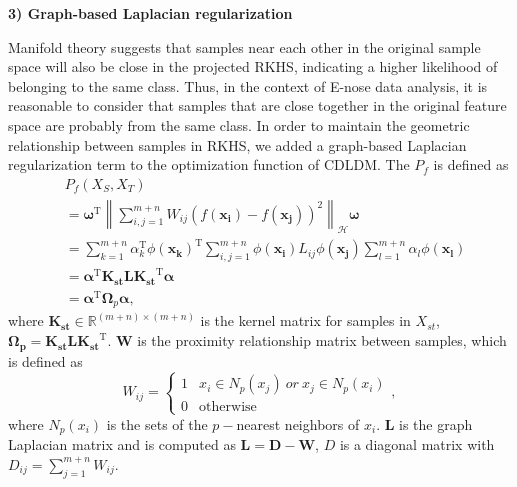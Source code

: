 \documentclass[a4paper]{cas-sc}
\begin{document}
\textbf{3) Graph-based Laplacian regularization}

Manifold theory suggests that samples near each other in the original sample space will also be close in the projected RKHS, indicating a higher likelihood of belonging to the same class. Thus, in the context of E-nose data analysis, it is reasonable to consider that samples that are close together in the original feature space are probably from the same class. In order to maintain the geometric relationship between samples in RKHS, we added a graph-based Laplacian regularization term to the optimization function of CDLDM. The $P_f$ is defined as 
\begin{equation}\label{Pf}
\begin{aligned}
&P_{f}\left(X_{{S}}, X_{T}\right) \\
& =\boldsymbol{\omega}^{\mathrm{T}}\left\|\sum_{i, j=1}^{m+n} W_{ij} \left(f\left(\boldsymbol{x_i}\right)-f\left(\boldsymbol{x_j}\right)\right)^{2}\right\|_{\mathcal{H}} \boldsymbol{\omega} \\
& =\sum_{k=1}^{m+n} \alpha_{k}^{\mathrm{T}} \phi\left(\boldsymbol{x_k}\right)^{\mathrm{T}} \sum_{i, j=1}^{m+n} \phi\left(\boldsymbol{x_i}\right) L_{i j} \phi\left(\boldsymbol{x_j}\right) \sum_{l=1}^{m+n} \alpha_{l} \phi\left(\boldsymbol{x_l}\right) \\
& ={\boldsymbol{\alpha}}^{\mathrm{T}} \boldsymbol{K_{st}} \boldsymbol{L} \boldsymbol{K_{st}}^{\mathrm{T}} {\boldsymbol{\alpha}} \\
& ={\boldsymbol{\alpha}}^{\mathrm{T}} {\boldsymbol{\Omega}}_{{p}} {\boldsymbol{\alpha}},
\end{aligned}
\end{equation}
where $\boldsymbol{K_{st}} \in \mathbb{R}^{(m+n) \times (m+n)}$ is the kernel matrix for samples in $X_{st}$, $\boldsymbol{\Omega_{p}} = \boldsymbol{K_{st}} \boldsymbol{L} \boldsymbol{K_{st}}^{\mathrm{T}} $. $\boldsymbol{W}$ is the proximity relationship matrix between samples, which is defined as
\begin{equation}
W_{ij} = \begin{cases}1 & x_i \in N_{p}(x_j)\ or\ x_j \in N_{p}(x_i) \\ 0 & {\text {otherwise}}\end{cases},
\label{p}
\end{equation}
where $N_{p}(x_i)$ is the sets of the $p-$nearest neighbors of $x_i$. $\boldsymbol{L}$ is the graph Laplacian matrix and is computed as $\boldsymbol{L} = \boldsymbol{D} - \boldsymbol{W}$, $D$ is a diagonal matrix with $D_{ij} = \sum\nolimits_{j=1}^{m+n} W_{ij}$.
\end{document}
